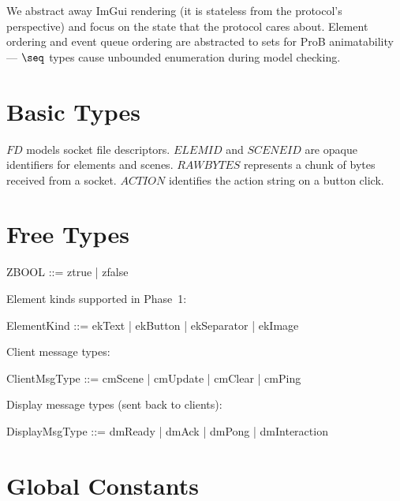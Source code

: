 \documentclass[a4paper,10pt,fleqn]{article}
\begin{document}
We abstract away ImGui rendering (it is stateless from the
protocol's perspective) and focus on the state that the protocol
cares about.  Element ordering and event queue ordering are
abstracted to sets for ProB animatability --- $\seq$ types
cause unbounded enumeration during model checking.

\section{Basic Types}

\begin{zed}
\end{zed}

$FD$ models socket file descriptors.  $ELEMID$ and $SCENEID$ are
opaque identifiers for elements and scenes.  $RAWBYTES$ represents
a chunk of bytes received from a socket.  $ACTION$ identifies
the action string on a button click.

\section{Free Types}

\begin{zed}
  ZBOOL ::= ztrue | zfalse
\end{zed}

Element kinds supported in Phase~1:
\begin{zed}
  ElementKind ::= ekText | ekButton | ekSeparator | ekImage
\end{zed}

Client message types:
\begin{zed}
  ClientMsgType ::= cmScene | cmUpdate | cmClear | cmPing
\end{zed}

Display message types (sent back to clients):
\begin{zed}
  DisplayMsgType ::= dmReady | dmAck | dmPong | dmInteraction
\end{zed}

\section{Global Constants}
\end{document}
